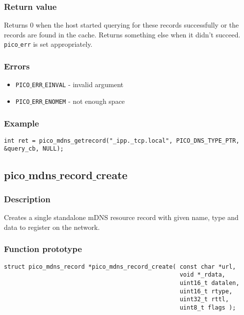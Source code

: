 \subsubsection*{Return value}
Returns 0 when the host started querying for these records successfully or the records are found in the cache. Returns something else when it didn't succeed. \texttt{pico$\_$err} is set appropriately.

\subsubsection*{Errors}
\begin{itemize}[noitemsep]
\item \texttt{PICO$\_$ERR$\_$EINVAL} - invalid argument
\item \texttt{PICO$\_$ERR$\_$ENOMEM} - not enough space
\end{itemize}

\subsubsection*{Example}
\begin{verbatim}
int ret = pico_mdns_getrecord("_ipp._tcp.local", PICO_DNS_TYPE_PTR, &query_cb, NULL);
\end{verbatim}


\subsection{pico$\_$mdns$\_$record$\_$create}

\subsubsection*{Description}
Creates a single standalone mDNS resource record with given name, type and data to register on the network.

\subsubsection*{Function prototype}
\begin{verbatim}
struct pico_mdns_record *pico_mdns_record_create( const char *url,
                                                  void *_rdata,
                                                  uint16_t datalen,
                                                  uint16_t rtype,
                                                  uint32_t rttl,
                                                  uint8_t flags );
\end{verbatim}

